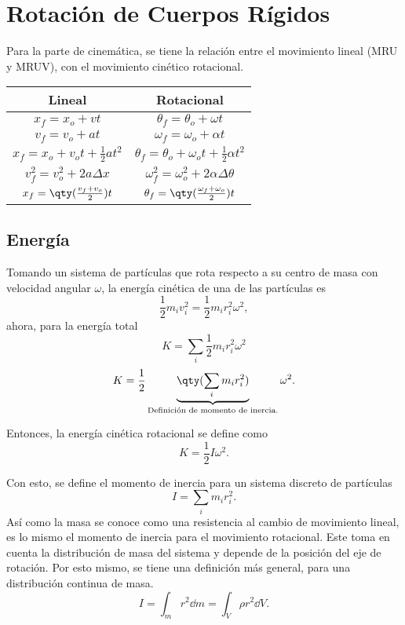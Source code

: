\section*{Rotación de Cuerpos Rígidos}


Para la parte de cinemática, se tiene la relación entre el movimiento lineal (MRU y MRUV), con el movimiento cinético rotacional.

\begin{table}[H]
	\centering
	\begin{tabular}{||c|c||}
		\hline
		\hline
			Lineal & Rotacional \\
		\hline
		\hline
			$x_f = x_o + vt$ & $\theta _f = \theta _o + \omega t$ \\
		\hline
			$v_f = v_o + at$ & $\omega _f = \omega _o + \alpha t$ \\
			$x_f = x_o + v_o t + \frac{1}{2} at^2$ & $\theta _f = \theta _o + \omega _o t + \frac{1}{2} \alpha t^2$ \\
			$v_f ^2 = v_o ^2 + 2a\Delta x$ & $\omega _f ^2 = \omega _o ^2 + 2\alpha \Delta \theta$ \\
			$x_f = \qty(\frac{v_f + v_o}{2})t$ & $\theta _f = \qty(\frac{\omega _f + \omega _o}{2})t$ \\
		\hline
		\hline
	\end{tabular}
\end{table}

\subsection*{Energía}
Tomando un sistema de partículas que rota respecto a su centro de masa con velocidad angular $\omega$, la energía cinética de una de las partículas es
	$$ \frac{1}{2} m_i v_i ^2 = \frac{1}{2} m_i r_i ^2 \omega ^2, $$
ahora, para la energía total
	$$ K = \sum _i \frac{1}{2} m_i r_i ^2 \omega ^2 $$
	$$ K = \frac{1}{2} \underbrace{\qty(\sum _i m_i r_i ^2)}_{\text{Definición de momento de inercia.}} \omega ^2. $$

Entonces, la energía cinética rotacional se define como
	$$ K = \frac{1}{2} I\omega ^2. $$

Con esto, se define el momento de inercia para un sistema discreto de partículas
	$$ I = \sum _i m_i r_i ^2. $$
Así como la masa se conoce como una resistencia al cambio de movimiento lineal, es lo mismo el momento de inercia para el movimiento rotacional. Este toma en cuenta la distribución de masa del sistema y depende de la posición del eje de rotación. Por esto mismo, se tiene una definición más general, para una distribución continua de masa.
	$$ I = \int _m r^2 \dd{m} = \int _V \rho r^2 \dd{V}. $$

